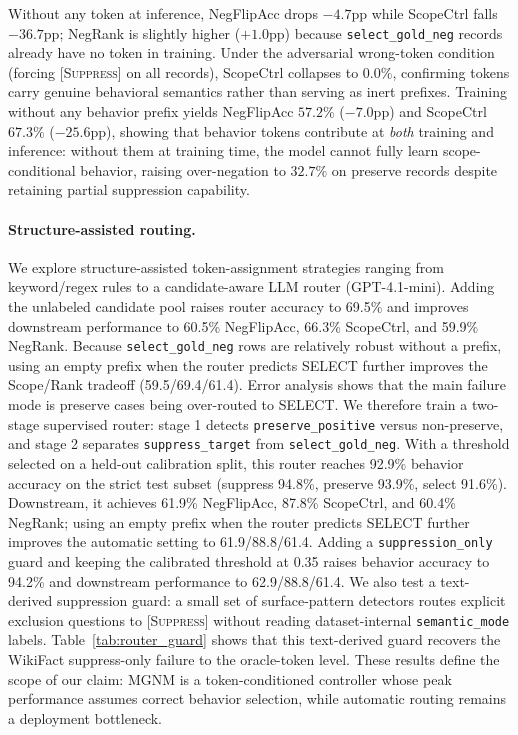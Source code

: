 \documentclass[letterpaper]{article}
\newcommand{\suppress}{[\textsc{Suppress}]}
\begin{document}
Without any token at inference, NegFlipAcc drops $-4.7$pp while ScopeCtrl falls $-36.7$pp;
NegRank is slightly higher ($+1.0$pp) because \texttt{select\_gold\_neg}
records already have no token in training.
Under the adversarial wrong-token condition (forcing \textsc{[Suppress]} on all
records), ScopeCtrl collapses to $0.0\%$, confirming tokens carry genuine
behavioral semantics rather than serving as inert prefixes.
Training without any behavior prefix yields NegFlipAcc $57.2\%$ ($-7.0$pp) and
ScopeCtrl $67.3\%$ ($-25.6$pp), showing that behavior tokens contribute at
\emph{both} training and inference: without them at training time, the model
cannot fully learn scope-conditional behavior, raising over-negation to $32.7\%$
on preserve records despite retaining partial suppression capability.

\paragraph{Structure-assisted routing.}
We explore structure-assisted token-assignment strategies ranging from keyword/regex
rules to a candidate-aware LLM router (GPT-4.1-mini).
Adding the unlabeled candidate pool raises router accuracy to 69.5\% and
improves downstream performance to 60.5\% NegFlipAcc, 66.3\% ScopeCtrl, and
59.9\% NegRank.
Because \texttt{select\_gold\_neg} rows are relatively robust without a prefix,
using an empty prefix when the router predicts SELECT further improves the
Scope/Rank tradeoff (59.5/69.4/61.4).
Error analysis shows that the main failure mode is preserve cases being
over-routed to SELECT. We therefore train a two-stage supervised router:
stage 1 detects \texttt{preserve\_positive} versus non-preserve, and stage 2
separates \texttt{suppress\_target} from \texttt{select\_gold\_neg}. With a
threshold selected on a held-out calibration split, this router reaches 92.9\%
behavior accuracy on the strict test subset (suppress 94.8\%, preserve 93.9\%,
select 91.6\%). Downstream, it achieves 61.9\% NegFlipAcc, 87.8\% ScopeCtrl,
and 60.4\% NegRank; using an empty prefix when the router predicts SELECT
further improves the automatic setting to 61.9/88.8/61.4. Adding a
\texttt{suppression\_only} guard and keeping the calibrated threshold at 0.35
raises behavior accuracy to 94.2\% and downstream performance to
62.9/88.8/61.4. We also test a text-derived suppression guard: a small set of
surface-pattern detectors routes explicit exclusion questions to \suppress{}
without reading dataset-internal \texttt{semantic\_mode} labels. Table~\ref{tab:router_guard}
shows that this text-derived guard recovers the WikiFact suppress-only failure
to the oracle-token level.
These results define the scope of our claim: MGNM is a token-conditioned
controller whose peak performance assumes correct behavior selection, while
automatic routing remains a deployment bottleneck.
\end{document}
